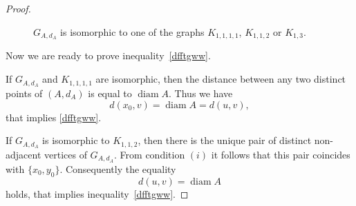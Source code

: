 \documentclass[11pt]{article}
\theoremstyle{definition}
\theoremstyle{remark}
\numberwithin{equation}{section}
\begin{document}
\begin{proof}
\begin{figure}[H]
  \caption{ $G_{A,d_A}$ is isomorphic to one of the graphs $K_{1,1,1,1}$, $K_{1,1,2}$ or $K_{1,3}$.}
  \label{cis4}
\end{figure}



Now we are ready to prove
inequality~\eqref{dfftgww}.

If $G_{A,d_A}$ and $K_{1,1,1,1}$ are isomorphic,
then the distance between
any two distinct points of $(A,d_A)$ is equal to $\operatorname{diam} A$. Thus we have
\begin{equation}\label{eq:diam-eq}
d(x_0,v) = \operatorname{diam} A = d(u,v),
\end{equation}
that implies \eqref{dfftgww}.

If $G_{A,d_A}$ is isomorphic to $K_{1,1,2}$,
then there  is the unique pair of distinct
non-adjacent vertices of $G_{A,d_A}$.
From condition $(i)$ it follows that this pair coincides with $\{x_0,y_0\}$. Consequently the equality 
\begin{equation*}
    d(u,v)=\operatorname{diam}A
\end{equation*}
holds, that implies inequality~\eqref{dfftgww}.


\end{proof}
\end{document}
